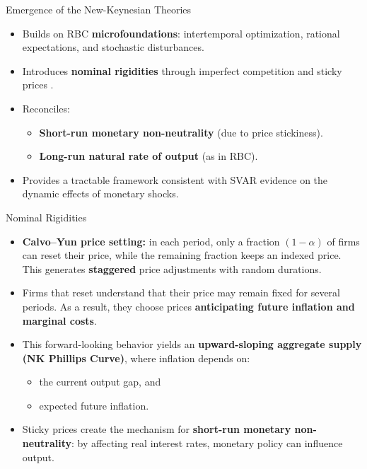 \documentclass[11pt,aspectratio=169]{beamer}
\begin{document}
\begin{frame}{Emergence of the New-Keynesian Theories}
\small

\begin{itemize}
  \item Builds on RBC \textbf{microfoundations}: intertemporal optimization, rational expectations, and stochastic disturbances.

  \item Introduces \textbf{nominal rigidities} through imperfect competition and sticky prices  
        \parencite{mankiw1985}.

  \item Reconciles:
    \begin{itemize}
      \item \textbf{Short-run monetary non-neutrality} (due to price stickiness).
      \item \textbf{Long-run natural rate of output} (as in RBC).
    \end{itemize}

  \item Provides a tractable framework consistent with SVAR evidence on the dynamic effects of monetary shocks.
\end{itemize}

\end{frame}

\begin{frame}{Nominal Rigidities}
\small

\begin{itemize}
  \item \textbf{Calvo–Yun price setting:} in each period, only a fraction $(1-\alpha)$ of firms can reset their price, while the remaining fraction keeps an indexed price.  
        This generates \textbf{staggered} price adjustments with random durations.

  \item Firms that reset understand that their price may remain fixed for several periods.  
        As a result, they choose prices \textbf{anticipating future inflation and marginal costs}.

  \item This forward-looking behavior yields an \textbf{upward-sloping aggregate supply (NK Phillips Curve)}, where inflation depends on:
    \begin{itemize}
      \item the current output gap, and  
      \item expected future inflation.
    \end{itemize}

  \item Sticky prices create the mechanism for \textbf{short-run monetary non-neutrality}:  
        by affecting real interest rates, monetary policy can influence output.
\end{itemize}

\end{frame}
\end{document}
